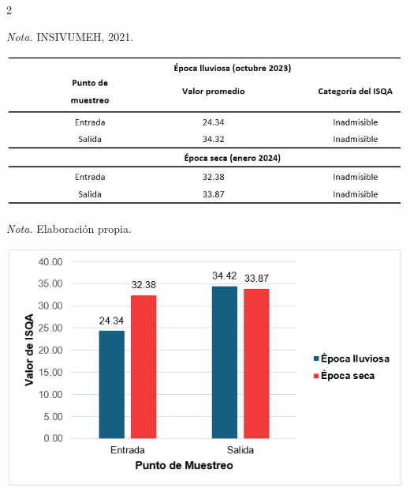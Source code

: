 \documentclass[12pt,spanish,Letterpaper,openany]{book}
\begin{document}
\begin {multicols}{2}
\begin {flushleft}
\begin{minipage}[c]{\columnwidth}
\emph{Nota.} INSIVUMEH, 2021.

\end{minipage}
\end {flushleft}

\begin {flushleft}
\noindent\begin{minipage}[c]{\columnwidth}

\textbf{}

\begin{center}\includegraphics[width=1\linewidth]{imagenes_articulos/art06_05} \end{center}

\emph{Nota.} Elaboración propia.

\end{minipage}
\end {flushleft}

\begin {flushleft}
\noindent\begin{minipage}[c]{\columnwidth}

\textbf{}

\begin{center}\includegraphics[width=1\linewidth]{imagenes_articulos/art06_06} \end{center}


\end{minipage}
\end{flushleft}
\end{multicols}
\end{document}

